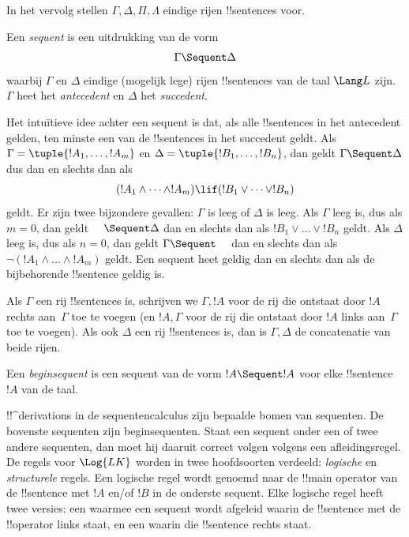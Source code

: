 \documentclass[../../../include/open-logic-section]{subfiles}
\begin{document}
      {}
      {}


In het vervolg stellen $\Gamma, \Delta, \Pi, \Lambda$ eindige rijen
!!{sentence}s voor.

\begin{defn}[Sequent]
Een \emph{sequent} is een uitdrukking van de vorm
\[
\Gamma \Sequent \Delta
\]
waarbij $\Gamma$ en $\Delta$ eindige (mogelijk lege) rijen
!!{sentence}s van de taal $\Lang L$ zijn. $\Gamma$ heet het
\emph{antecedent} en $\Delta$ het \emph{succedent}.
\end{defn}

\begin{explain}
Het intuïtieve idee achter een sequent is dat, als alle !!{sentence}s
in het antecedent gelden, ten minste een van de !!{sentence}s in het
succedent geldt. Als $\Gamma = \tuple{!A_1, \dots, !A_m}$ en $\Delta =
\tuple{!B_1, \dots, !B_n}$, dan geldt $\Gamma \Sequent \Delta$ dus dan
en slechts dan als
\[
(!A_1 \land \cdots \land !A_m) \lif (!B_1 \lor \cdots \lor
!B_n)
\]
geldt. Er zijn twee bijzondere gevallen: $\Gamma$ is leeg of $\Delta$
is leeg. Als $\Gamma$ leeg is, dus als $m = 0$, dan geldt $\quad
\Sequent \Delta$ dan en slechts dan als $!B_1 \lor \dots \lor !B_n$
geldt. Als $\Delta$ leeg is, dus als $n = 0$, dan geldt $\Gamma
\Sequent \quad$ dan en slechts dan als $\lnot(!A_1 \land \dots \land
!A_m)$ geldt. Een sequent heet geldig dan en slechts dan als de
bijbehorende !!{sentence} geldig is.
\end{explain}

Als $\Gamma$ een rij !!{sentence}s is, schrijven we $\Gamma, !A$ voor
de rij die ontstaat door $!A$ rechts aan~$\Gamma$ toe te voegen (en
$!A, \Gamma$ voor de rij die ontstaat door $!A$ links aan~$\Gamma$ toe
te voegen). Als ook $\Delta$ een rij !!{sentence}s is, dan is $\Gamma,
\Delta$ de concatenatie van beide rijen.

\begin{defn}[Beginsequent]
Een \emph{beginsequent} is een sequent
{van de vorm $!A \Sequent !A$} voor elke !!{sentence} $!A$ van de taal.
\end{defn}

!!^{derivation}s in de sequentencalculus zijn bepaalde bomen van
sequenten. De bovenste sequenten zijn beginsequenten. Staat een sequent
onder een of twee andere sequenten, dan moet hij daaruit correct volgen
volgens een afleidingsregel. De regels voor $\Log{LK}$ worden in twee
hoofdsoorten verdeeld: \emph{logische} en \emph{structurele} regels.
Een logische regel wordt genoemd naar de !!{main operator} van de
!!{sentence} met $!A$ en/of $!B$ in de onderste sequent. Elke logische
regel heeft twee versies: een waarmee een sequent wordt afgeleid waarin
de !!{sentence} met de !!{operator} links staat, en een waarin die
!!{sentence} rechts staat.
\end{document}
